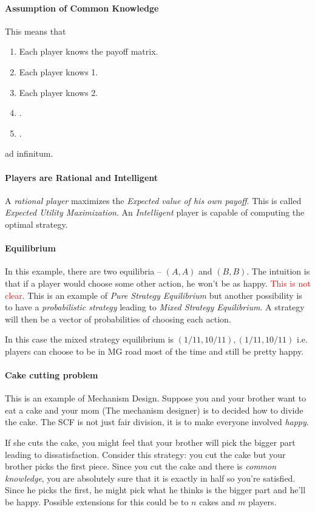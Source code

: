 \paragraph{Assumption of Common Knowledge} This means that 
\begin{enumerate}
	\item Each player knows the payoff matrix.
	\item Each player knows 1.
	\item Each player knows 2.
	\item .
	\item .
\end{enumerate}
ad infinitum. 

\paragraph{Players are Rational and Intelligent} A \textit{rational player} maximizes the \textit{Expected value of his own payoff}. This is called \textit{Expected Utility Maximization}. An \textit{Intelligent} player is capable of computing the optimal strategy.

\paragraph{Equilibrium} In this example, there are two equilibria -- $(A,A)$ and $(B,B)$. The intuition is that if a player would choose some other action, he won't be as happy. \textcolor{red}{This is not clear}. This is an example of \textit{Pure Strategy Equilibrium} but another possibility is to have a \textit{probabilistic strategy} leading to \textit{Mixed Strategy Equilibrium}. A strategy will then be a vector of probabilities of choosing each action.

In this case the mixed strategy equilibrium is $(1/11, 10/11), (1/11, 10/11)$ i.e. players can choose to be in MG road most of the time and still be pretty happy.

\paragraph{Cake cutting problem} This is an example of Mechanism Design. Suppose you and your brother want to eat a cake and your mom (The mechanism designer) is to decided how to divide the cake. The SCF is not just fair division, it is to make everyone involved \textit{happy}.

If she cuts the cake, you might feel that your brother will pick the bigger part leading to dissatisfaction. Consider this strategy: you cut the cake but your brother picks the first piece. Since you cut the cake and there is \textit{common knowledge}, you are absolutely sure that it is exactly in half so you're satisfied. Since he picks the first, he might pick what he thinks is the bigger part and he'll be happy. Possible extensions for this could be to $n$ cakes and $m$ players.


